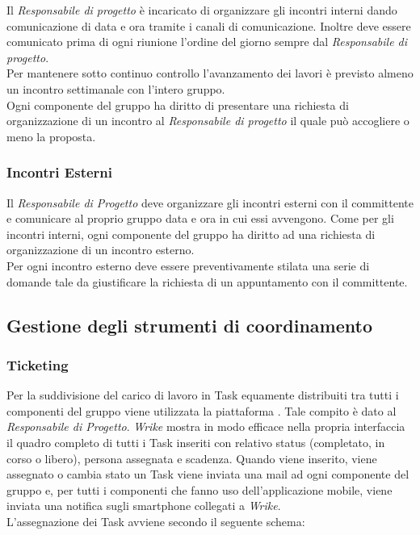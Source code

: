 \documentclass[../NormediProgetto.tex]{subfiles}
\begin{document}
	Il \textit{Responsabile di progetto} è incaricato di organizzare gli incontri interni dando comunicazione di data e ora tramite i canali di comunicazione. Inoltre deve essere comunicato prima di ogni riunione l'ordine del giorno sempre dal \textit{Responsabile di progetto}.
	\\ \noindent Per mantenere sotto continuo controllo l'avanzamento dei lavori è previsto almeno un incontro settimanale con l'intero gruppo.
	\\ \noindent Ogni componente del gruppo ha diritto di presentare una richiesta di organizzazione di un incontro al \textit{Responsabile di progetto} il quale può accogliere o meno la proposta.
	
	\subsubsection{Incontri Esterni}
	
	Il \textit{Responsabile di Progetto} deve organizzare gli incontri esterni con il committente e comunicare al proprio gruppo data e ora in cui essi avvengono. Come per gli incontri interni, ogni componente del gruppo ha diritto ad una richiesta di organizzazione di un incontro esterno.
	\\ \noindent Per ogni incontro esterno deve essere preventivamente stilata una serie di domande tale da giustificare la richiesta di un appuntamento con il committente.
	
	\subsection{Gestione degli strumenti di coordinamento}
	
	\subsubsection{Ticketing}
	
	Per la suddivisione del carico di lavoro in Task equamente distribuiti tra tutti i componenti del gruppo viene utilizzata la piattaforma . Tale compito è dato al \textit{Responsabile di Progetto}. \textit{Wrike} mostra in modo efficace nella propria interfaccia il quadro completo di tutti i Task inseriti con relativo status (completato, in corso o libero), persona assegnata e scadenza. Quando viene inserito, viene assegnato o cambia stato un Task viene inviata una mail ad ogni componente del gruppo e, per tutti i componenti che fanno uso dell'applicazione mobile, viene inviata una notifica sugli smartphone collegati a \textit{Wrike}.
	\\ \noindent L'assegnazione dei Task avviene secondo il seguente schema:
	
\end{document}
